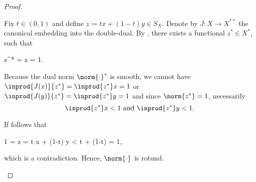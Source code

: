 \begin{proof}
\begin{enumerate}
          Fix \( t \in (0, 1) \) and define \( z \coloneqq tx + (1-t)y \in S_X \). Denote by \( J: X \to X^{**} \) the canonical embedding into the double-dual. By , there exists a functional \( z^* \in X^* \), such that
          \begin{balign*}
             {z^*}
            =
             z
            =
            1.
          \end{balign*}

          Because the dual norm \( \norm{\cdot}^* \) is smooth, we cannot have \( \inprod{J(x)} {z^*} =  \inprod{z^*} x = 1 \) or \( \inprod{J(y)} {z^*} = \inprod{z^*} y = 1 \) and since \( \norm{z^*} = 1 \), necessarily
          \begin{equation*}
            \inprod{z^*} x < 1 \text{ and } \inprod{z^*} y < 1.
          \end{equation*}

          If follows that
          \begin{balign*}
            1
            =
             z
            =
            t  x + (1-t)  y
            <
            t + (1-t)
            =
            1,
          \end{balign*}
          which is a contradiction. Hence, \( \norm{\cdot} \) is rotund.
  \end{enumerate}
\end{proof}

